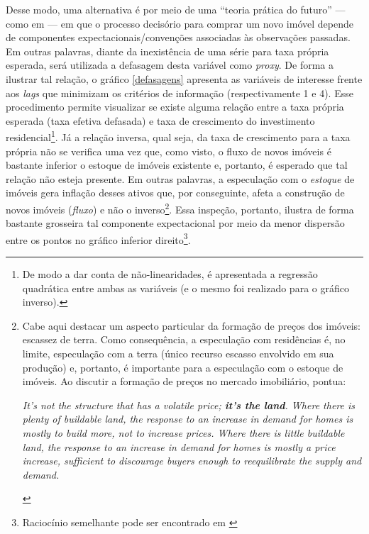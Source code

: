 Desse modo, uma alternativa é por meio de uma ``teoria prática do futuro'' --- como em \textcite[p.~214]{keynes_general_1937} --- em que o processo decisório para comprar um novo imóvel depende de componentes expectacionais/convenções associadas às observações passadas.
Em outras palavras, diante da inexistência de uma série para taxa própria esperada, será utilizada a defasagem desta variável como \textit{proxy}.
De forma a ilustrar tal relação, o gráfico \ref{defasagens} apresenta as variáveis de interesse frente aos \textit{lags} que minimizam os critérios de informação (respectivamente 1 e 4). 
Esse procedimento permite visualizar se existe alguma relação entre a taxa própria esperada (taxa efetiva defasada) e taxa de crescimento do investimento residencial\footnote{De modo a dar conta de não-linearidades, é apresentada a regressão quadrática entre ambas as variáveis (e o mesmo foi realizado para o gráfico inverso).}. Já a relação inversa, qual seja, da taxa de crescimento para a taxa própria não se verifica uma vez que, como visto, o fluxo de novos imóveis é bastante inferior o estoque de imóveis existente e, portanto, é esperado que tal relação não esteja presente. Em outras palavras, a especulação com o \textit{estoque}  de imóveis gera inflação desses ativos que, por conseguinte, afeta a construção de novos imóveis (\textit{fluxo}) e não o inverso\footnote{
	Cabe aqui destacar um aspecto particular da formação de preços dos imóveis: escassez de terra. Como consequência, a especulação com residências é, no limite, especulação com a terra (único recurso escasso envolvido em sua produção) e, portanto, é importante para a especulação com o estoque de imóveis. Ao discutir a formação de preços no mercado imobiliário, \textcite[p.~349, grifos adicionados]{leamer_housing_2007} pontua:
	
	\begin{citacao}
	\textit{It’s not the structure that has a volatile price; \textbf{it's the land}. Where there is plenty of buildable land, the response to an increase in demand for homes is mostly to build more, not to increase prices. Where there is little buildable land, the response to an increase in demand for homes is mostly a price increase, sufficient to discourage buyers enough to reequilibrate the supply and demand.}
	\end{citacao}	
}. 
Essa inspeção, portanto, ilustra de forma bastante grosseira tal componente expectacional por meio da menor dispersão entre os pontos no gráfico inferior direito\footnote{Raciocínio semelhante pode ser encontrado em \textcite{girardi_autonomous_2015}}.  


